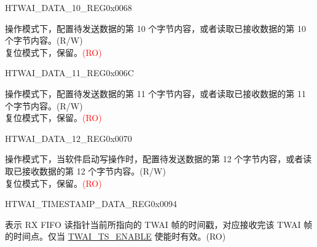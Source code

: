 \begin{register}{H}{TWAI\_DATA\_10\_REG}{0x0068}\label{regdesc:TWAIDATA10REG}
%
%
\regnewline%
\begin{regdesc}\begin{reglist}
\label{fielddesc:TWAITXDATA10}\item [TWAI\_TX\_DATA\_10] 操作模式下，配置待发送数据的第 10 个字节内容，或者读取已接收数据的第 10 个字节内容。(R/W)\\
复位模式下，保留。\textcolor{red}{(RO)}
\end{reglist}\end{regdesc}
\end{register}


\begin{register}{H}{TWAI\_DATA\_11\_REG}{0x006C}\label{regdesc:TWAIDATA11REG}
%
%
\regnewline%
\begin{regdesc}\begin{reglist}
\label{fielddesc:TWAITXDATA11}\item [TWAI\_TX\_DATA\_11] 操作模式下，配置待发送数据的第 11 个字节内容，或者读取已接收数据的第 11 个字节内容。(R/W)\\
复位模式下，保留。\textcolor{red}{(RO)}
\end{reglist}\end{regdesc}
\end{register}


\begin{register}{H}{TWAI\_DATA\_12\_REG}{0x0070}\label{regdesc:TWAIDATA12REG}
%
%
\regnewline%
\begin{regdesc}\begin{reglist}
\label{fielddesc:TWAITXDATA12}\item [TWAI\_TX\_DATA\_12] 操作模式下，当软件启动写操作时，配置待发送数据的第 12 个字节内容，或者读取已接收数据的第 12 个字节内容。(R/W)\\
复位模式下，保留。\textcolor{red}{(RO)}
\end{reglist}\end{regdesc}
\end{register}


\begin{register}{H}{TWAI\_TIMESTAMP\_DATA\_REG}{0x0094}\label{regdesc:TWAITIMESTAMPDATAREG}
%
\regnewline%
\begin{regdesc}\begin{reglist}
\label{fielddesc:TWAITIMESTAMPDATA}\item [TWAI\_TIMESTAMP\_DATA] 表示 RX FIFO 读指针当前所指向的 TWAI 帧的时间戳，对应接收完该 TWAI 帧的时间点。仅当 \hyperref[fielddesc:TWAITSENABLE]{TWAI\_TS\_ENABLE} 使能时有效。(RO)
\end{reglist}\end{regdesc}
\end{register}


